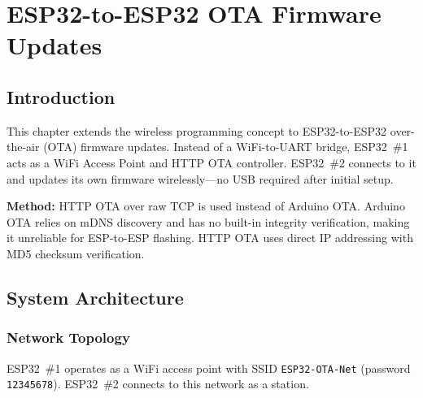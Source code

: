 \documentclass[conference]{IEEEtran}
\begin{document}
\section{ESP32-to-ESP32 OTA Firmware Updates}

\subsection{Introduction}

This chapter extends the wireless programming concept to ESP32-to-ESP32
over-the-air (OTA) firmware updates.
Instead of a WiFi-to-UART bridge, ESP32~\#1 acts as a WiFi Access Point and
HTTP OTA controller.
ESP32~\#2 connects to it and updates its own firmware wirelessly---no USB
required after initial setup.

\textbf{Method:} HTTP OTA over raw TCP is used instead of Arduino OTA.
Arduino OTA relies on mDNS discovery and has no built-in integrity
verification, making it unreliable for ESP-to-ESP flashing.
HTTP OTA uses direct IP addressing with MD5 checksum verification.

\subsection{System Architecture}

\begin{table}[H]
\centering
\caption{Device Roles and Addresses}
\end{table}

\subsubsection{Network Topology}
ESP32~\#1 operates as a WiFi access point with SSID
\texttt{ESP32-OTA-Net} (password \texttt{12345678}).
ESP32~\#2 connects to this network as a station.
\end{document}
